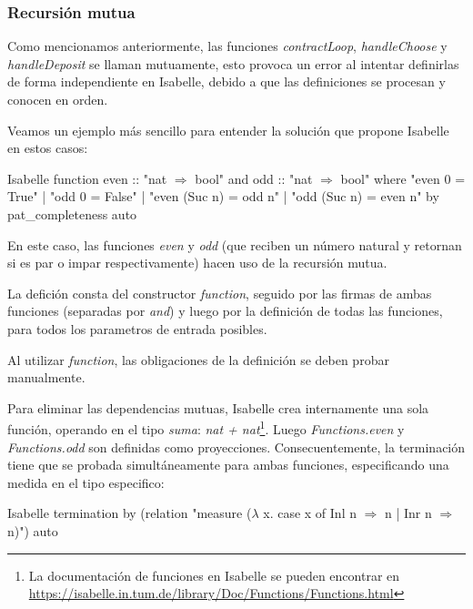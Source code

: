 \documentclass[12pt]{book}
\begin{document}
\subsubsection{Recursión mutua}\label{sssec:recursion_mutua}

Como mencionamos anteriormente, las funciones \textit{contractLoop}, \textit{handleChoose} y \textit{handleDeposit} se llaman mutuamente, esto provoca un error al intentar definirlas de forma independiente en Isabelle, debido a que las definiciones se procesan y conocen en orden.

Veamos un ejemplo más sencillo para entender la solución que propone Isabelle en estos casos:

\begin{code}[title=Definición de funciones \textit{odd} y \textit{even} mediante recursión mutua.]{Isabelle}
function even :: "nat $\Rightarrow$ bool"
and odd :: "nat $\Rightarrow$ bool"
where
"even 0 = True"
| "odd 0 = False"
| "even (Suc n) = odd n"
| "odd (Suc n) = even n"
by pat_completeness auto
\end{code}

En este caso, las funciones \textit{even} y \textit{odd} (que reciben un número natural y retornan si es par o impar respectivamente) hacen uso de la recursión mutua.

La defición consta del constructor \textit{function}, seguido por las firmas de ambas funciones (separadas por \textit{and}) y luego por la definición de todas las funciones, para todos los parametros de entrada posibles.

Al utilizar \textit{function}, las obligaciones de la definición se deben probar manualmente.

Para eliminar las dependencias mutuas, Isabelle crea internamente una sola función, operando en el tipo \textit{suma}: \textit{nat + nat}\footnote{La documentación de funciones en Isabelle se pueden encontrar en \url{https://isabelle.in.tum.de/library/Doc/Functions/Functions.html}}. Luego \textit{Functions.even} y \textit{Functions.odd} son definidas como proyecciones. Consecuentemente, la terminación tiene que se probada simultáneamente para ambas funciones, especificando una medida en el tipo especifico:

\begin{code}[title=Prueba de terminación de las funciones \textit{odd} y \textit{even}.]{Isabelle}
termination
by (relation "measure ($\lambda$ x. case x of Inl n $\Rightarrow$ n | Inr n $\Rightarrow$ n)") auto
\end{code}
\end{document}
